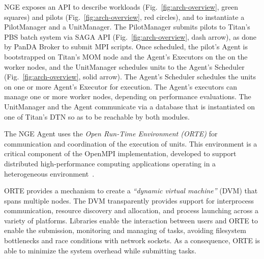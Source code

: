 NGE exposes an API to describe workloads (Fig.~\ref{fig:arch-overview}, green
squares) and pilots (Fig.~\ref{fig:arch-overview}, red circles), and to
instantiate a PilotManager and a UnitManager.   The PilotManager submits
pilots to Titan's PBS  batch system via SAGA API (Fig.~\ref{fig:arch-overview}, dash arrow), as done by PanDA Broker to submit MPI scripts. Once
scheduled, the pilot's Agent is bootstrapped on Titan's MOM node and
the Agent's Executors on the on the worker
nodes, and the UnitManager schedules units to the Agent's Scheduler
(Fig.~\ref{fig:arch-overview}, solid arrow). The Agent's Scheduler schedules
the units on one or more Agent's Executor for execution. The Agent's executors
can manage one or more worker nodes, depending on performance evaluations. The
UnitManager and the Agent communicate via a database that is instantiated on
one of Titan's DTN so as to be reachable by both modules.

The NGE Agent uses the \emph{Open Run-Time Environment (ORTE)} for communication
and coordination of the execution of units. This environment is a critical
component of the OpenMPI implementation, developed to support distributed
high-performance computing applications operating in a heterogeneous
environment~\cite{castain05:_open_rte, cug-2016}.

ORTE provides a mechanism to create a \emph{``dynamic virtual machine''} (DVM)
that spans multiple nodes. The DVM transparently provides support for
interprocess communication, resource discovery and allocation, and process
launching across a variety of platforms. Libraries enable the interaction
between users and ORTE to enable the submission, monitoring and managing of
tasks, avoiding filesystem bottlenecks and race conditions with network sockets.
As a consequence, ORTE is able to minimize the system overhead while submitting
tasks.
